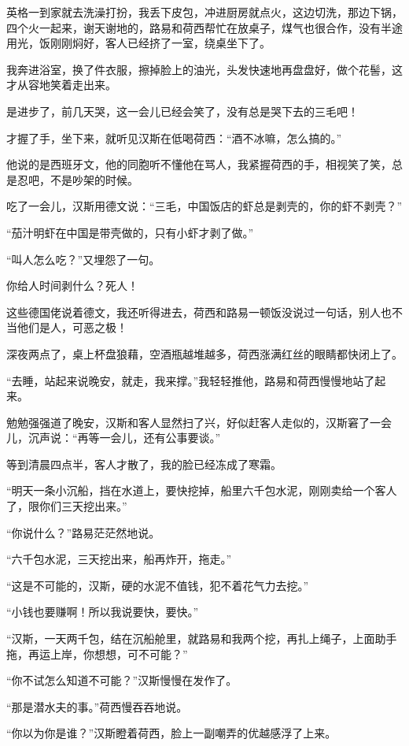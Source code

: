 \par 英格一到家就去洗澡打扮，我丢下皮包，冲进厨房就点火，这边切洗，那边下锅，四个火一起来，谢天谢地的，路易和荷西帮忙在放桌子，煤气也很合作，没有半途用光，饭刚刚焖好，客人已经挤了一室，绕桌坐下了。
\par 我奔进浴室，换了件衣服，擦掉脸上的油光，头发快速地再盘盘好，做个花髻，这才从容地笑着走出来。
\par 是进步了，前几天哭，这一会儿已经会笑了，没有总是哭下去的三毛吧！
\par 才握了手，坐下来，就听见汉斯在低喝荷西：“酒不冰嘛，怎么搞的。”
\par 他说的是西班牙文，他的同胞听不懂他在骂人，我紧握荷西的手，相视笑了笑，总是忍吧，不是吵架的时候。
\par 吃了一会儿，汉斯用德文说：“三毛，中国饭店的虾总是剥壳的，你的虾不剥壳？”
\par “茄汁明虾在中国是带壳做的，只有小虾才剥了做。”
\par “叫人怎么吃？”又埋怨了一句。
\par 你给人时间剥什么？死人！
\par 这些德国佬说着德文，我还听得进去，荷西和路易一顿饭没说过一句话，别人也不当他们是人，可恶之极！
\par 深夜两点了，桌上杯盘狼藉，空酒瓶越堆越多，荷西涨满红丝的眼睛都快闭上了。
\par “去睡，站起来说晚安，就走，我来撑。”我轻轻推他，路易和荷西慢慢地站了起来。
\par 勉勉强强道了晚安，汉斯和客人显然扫了兴，好似赶客人走似的，汉斯窘了一会儿，沉声说：“再等一会儿，还有公事要谈。”
\par 等到清晨四点半，客人才散了，我的脸已经冻成了寒霜。
\par “明天一条小沉船，挡在水道上，要快挖掉，船里六千包水泥，刚刚卖给一个客人了，限你们三天挖出来。”
\par “你说什么？”路易茫茫然地说。
\par “六千包水泥，三天挖出来，船再炸开，拖走。”
\par “这是不可能的，汉斯，硬的水泥不值钱，犯不着花气力去挖。”
\par “小钱也要赚啊！所以我说要快，要快。”
\par “汉斯，一天两千包，结在沉船舱里，就路易和我两个挖，再扎上绳子，上面助手拖，再运上岸，你想想，可不可能？”
\par “你不试怎么知道不可能？”汉斯慢慢在发作了。
\par “那是潜水夫的事。”荷西慢吞吞地说。
\par “你以为你是谁？”汉斯瞪着荷西，脸上一副嘲弄的优越感浮了上来。
